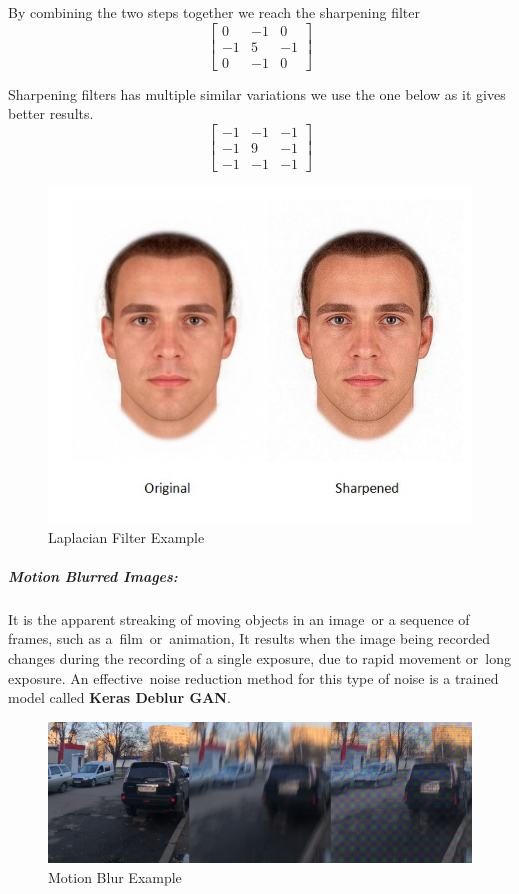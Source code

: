 By combining the two steps together we reach the sharpening filter
\[
\begin{bmatrix}
0 & -1 & 0 \\
-1 & 5 & -1 \\
0 & -1 & 0
\end{bmatrix} \]

Sharpening filters has multiple similar variations we use the one below as it gives better results.
\[
\begin{bmatrix}
-1 & -1 & -1 \\
-1 & 9 & -1 \\
-1 & -1 & -1
\end{bmatrix} \]

\begin{figure}[H]
	\centering
	\includegraphics[width=0.5\linewidth]{images/Sharpened.jpg}
	\caption{Laplacian Filter Example}
	\label{figure:laplacian}
\end{figure}

\subparagraph{Motion Blurred Images:}
It is the apparent streaking of moving objects in an image or a sequence of frames, such as a film or animation, It results when the image being recorded changes during the recording of a single exposure, due to rapid movement or long exposure.\newline
An effective noise reduction method for this type of noise is a trained model called \textbf{Keras Deblur GAN}.\newline
\begin{figure}[H]
	\centering
	\includegraphics[width=\linewidth]{images/motion_blur.png}
	\caption{Motion Blur Example}
\end{figure}

